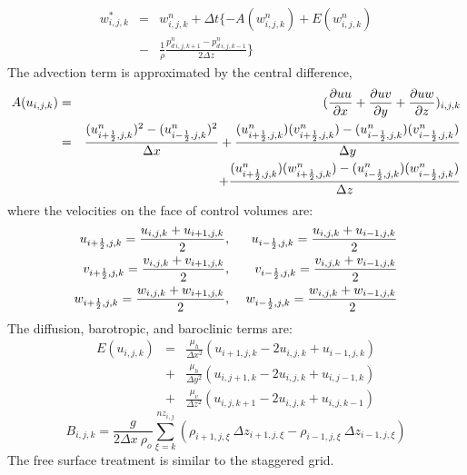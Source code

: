 \begin {eqnarray}
w_{i,j,k}^{*} &=& w_{i,j,k}^{n}+ \Delta t
\{ -A(w_{i,j,k}^n)+E(w_{i,j,k}^n) \nonumber \\
&-&\frac{1}{\rho}\frac{p_{d \ i,j,k+1}^n-p_{d \ i,j,k-1}^n}{ 2\Delta z}
\}
\end{eqnarray}
The advection term is approximated by the central difference,
\begin{eqnarray}
A(u_{i,j,k})&=&( \frac{\partial uu}{\partial x} +  \frac{\partial
uv}{\partial y}+\frac{\partial uw}{\partial z})_{i,j, k}\nonumber\\
&=&\frac{(u^n_{i+\frac{1}{2},j,k})^2-(u^n_{i-\frac{1}{2},j,k})^2}{\Delta
x}
+\frac{(u^n_{i+\frac{1}{2},j,k})(v^n_{i+\frac{1}{2},j,k})
-(u^n_{i-\frac{1}{2},j,k})(v^n_{i-\frac{1}{2},j,k})}{\Delta
y}\nonumber \\
& & +\frac{(u^n_{i+\frac{1}{2},j,k})(w^n_{i+\frac{1}{2},j,k})
-(u^n_{i-\frac{1}{2},j,k})(w^n_{i-\frac{1}{2},j,k})}{\Delta z}
\end{eqnarray}
where the velocities on the face of control volumes are:
\begin{eqnarray*}
u_{i+\f{1}{2},j,k}=\f{u_{i,j,k}+u_{i+1,j,k}}{2} &,& \ u_{i-\f{1}{2},j,k}=\f{u_{i,j,k}+u_{i-1,j,k}}{2}\\
v_{i+\f{1}{2},j,k}=\f{v_{i,j,k}+v_{i+1,j,k}}{2} &,& \
v_{i-\f{1}{2},j,k}=\f{v_{i,j,k}+v_{i-1,j,k}}{2}\\
w_{i+\f{1}{2},j,k}=\f{w_{i,j,k}+w_{i+1,j,k}}{2} &,& \
w_{i-\f{1}{2},j,k}=\f{w_{i,j,k}+w_{i-1,j,k}}{2}
\end{eqnarray*}
 The diffusion, barotropic, and baroclinic terms are:
\begin{eqnarray}
E(u_{i,j,k}) &=& \frac{\mu_h}{\Delta x^2} (u_{i+1,j,k}-2u_{i,j,k} + u_{i-1,j,k})\nonumber \\
&+& \frac{\mu_h}{\Delta y^2} (u_{i,
j+1,k}-2u_{i,j,k} + u_{i,j-1,k})\nonumber \\
&+& \frac{\mu_v}{\Delta z^2} (u_{i,j,k+1}-2u_{i,j,k}+u_{i,j,k-1})
\end{eqnarray}
\begin{equation}
B_{i,j,k}= \frac{g}{2\Delta x \ \rho_o}
\sum_{\xi=k}^{nz_{i,j}}(\rho_{i+1,j,\xi} \ \Delta
z_{i+1,j,\xi}-\rho_{i-1,j,\xi} \ \Delta z_{i-1,j,\xi})
\end{equation}
 The free surface treatment is similar to the staggered grid.

